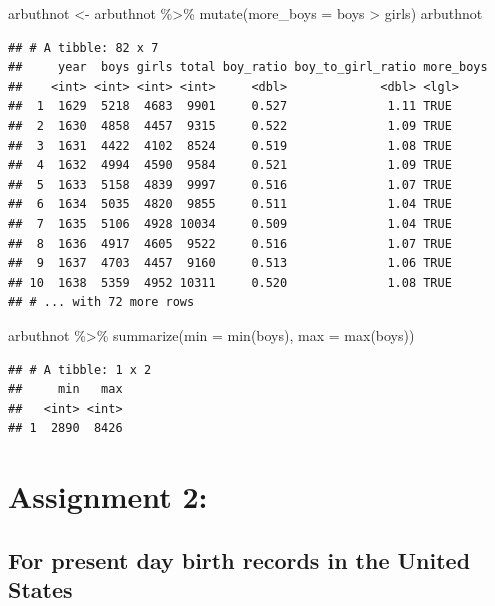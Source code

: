 \documentclass[
]{article}
\newenvironment{Shaded}{\begin{snugshade}}{\end{snugshade}}
\newcommand{\AttributeTok}[1]{\textcolor[rgb]{0.77,0.63,0.00}{#1}}
\newcommand{\FunctionTok}[1]{\textcolor[rgb]{0.00,0.00,0.00}{#1}}
\newcommand{\NormalTok}[1]{#1}
\newcommand{\OtherTok}[1]{\textcolor[rgb]{0.56,0.35,0.01}{#1}}
\newcommand{\SpecialCharTok}[1]{\textcolor[rgb]{0.00,0.00,0.00}{#1}}
\begin{document}
\begin{Shaded}
\begin{Highlighting}[]
\NormalTok{arbuthnot }\OtherTok{\textless{}{-}}\NormalTok{ arbuthnot }\SpecialCharTok{\%\textgreater{}\%}
  \FunctionTok{mutate}\NormalTok{(}\AttributeTok{more\_boys =}\NormalTok{ boys }\SpecialCharTok{\textgreater{}}\NormalTok{ girls)}
\NormalTok{arbuthnot}
\end{Highlighting}
\end{Shaded}

\begin{verbatim}
## # A tibble: 82 x 7
##     year  boys girls total boy_ratio boy_to_girl_ratio more_boys
##    <int> <int> <int> <int>     <dbl>             <dbl> <lgl>    
##  1  1629  5218  4683  9901     0.527              1.11 TRUE     
##  2  1630  4858  4457  9315     0.522              1.09 TRUE     
##  3  1631  4422  4102  8524     0.519              1.08 TRUE     
##  4  1632  4994  4590  9584     0.521              1.09 TRUE     
##  5  1633  5158  4839  9997     0.516              1.07 TRUE     
##  6  1634  5035  4820  9855     0.511              1.04 TRUE     
##  7  1635  5106  4928 10034     0.509              1.04 TRUE     
##  8  1636  4917  4605  9522     0.516              1.07 TRUE     
##  9  1637  4703  4457  9160     0.513              1.06 TRUE     
## 10  1638  5359  4952 10311     0.520              1.08 TRUE     
## # ... with 72 more rows
\end{verbatim}

\begin{Shaded}
\begin{Highlighting}[]
\NormalTok{arbuthnot }\SpecialCharTok{\%\textgreater{}\%}
  \FunctionTok{summarize}\NormalTok{(}\AttributeTok{min =} \FunctionTok{min}\NormalTok{(boys), }\AttributeTok{max =} \FunctionTok{max}\NormalTok{(boys))}
\end{Highlighting}
\end{Shaded}

\begin{verbatim}
## # A tibble: 1 x 2
##     min   max
##   <int> <int>
## 1  2890  8426
\end{verbatim}

\hypertarget{assignment-2}{%
\section{Assignment 2:}\label{assignment-2}}

\hypertarget{for-present-day-birth-records-in-the-united-states}{%
\subsection{For present day birth records in the United
States}\label{for-present-day-birth-records-in-the-united-states}}
\end{document}

